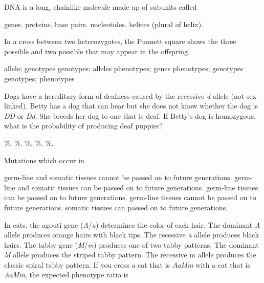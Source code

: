 \question
DNA is a long, chainlike molecule made up of subunits called

\begin{choices}
\choice genes.
\choice proteins.
\choice base pairs.
\correctchoice nucleotides.
\choice helices (plural of helix).
\end{choices}

\question
In a cross between two heterozygotes, the Punnett square shows the three possible \underline{\hspace{2cm}} and two possible \underline{\hspace{2cm}} that may appear in the offspring.

\begin{choices}
\choice allele; genotypes
\correctchoice genotypes; alleles
\choice phenotypes; genes
\choice phenotypes; genotypes
\choice genotypes; phenotypes
\end{choices}

\newpage

\question
Dogs have a hereditary form of deafness caused by the recessive \textit{d} allele (not sex-linked).  Betty has a dog that can hear but she does not know whether the dog is \textit{DD} or \textit{Dd}.  She breeds her dog to one that is deaf.  If Betty's dog is homozygous, what is the probability of producing deaf puppies?

\begin{choices}
\%.
\%.
\%.
\%.
\%.
\end{choices}

\question
Mutations which occur in 

\begin{choices}
\choice germ-line and somatic tissues cannot be passed on to future generations.
\choice germ-line  and somatic tissues can be passed on to future generations.
\correctchoice germ-line tissues can be passed on to future generations.
\choice germ-line tissues cannot be passed on to future generations.
\choice somatic tissues can passed on to future generations.
\end{choices}

\question
In cats, the agouti gene (\textit{A}/\textit{a}) determines the color of each hair. The dominant \textit{A} allele produces orange hairs with black tips.  The recessive \textit{a} allele produces black hairs.  The tabby gene (\textit{M}/\textit{m}) produces one of two tabby patterns.  The dominant \textit{M} allele produces the striped tabby pattern.  The recessive m allele produces the classic spiral tabby pattern. If you cross a cat that is \textit{AaMm} with a cat that is \textit{AaMm}, the expected phenotype ratio is

